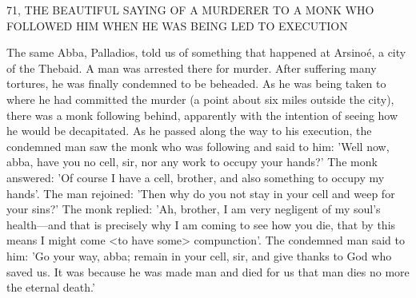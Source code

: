 71, THE BEAUTIFUL SAYING OF A MURDERER
TO A MONK WHO FOLLOWED HIM
WHEN HE WAS BEING LED TO EXECUTION

The same Abba, Palladios, told us of something that happened at
Arsinoé, a city of the Thebaid. A man was arrested there for
murder. After suffering many tortures, he was finally condemned to
be beheaded. As he was being taken to where he had committed the
murder (a point about six miles outside the city), there was a monk
following behind, apparently with the intention of seeing how he
would be decapitated. As he passed along the way to his execution,
the condemned man saw the monk who was following and said to
him: 'Well now, abba, have you no cell, sir, nor any work to occupy
your hands?' The monk answered: 'Of course I have a cell, brother,
and also something to occupy my hands'. The man rejoined: 'Then
why do you not stay in your cell and weep for your sins?' The
monk replied: 'Ah, brother, I am very negligent of my soul's
health—and that is precisely why I am coming to see how you die,
that by this means I might come <to have some> compunction'.
The condemned man said to him: 'Go your way, abba; remain in
your cell, sir, and give thanks to God who saved us. It was because
he was made man and died for us that man dies no more the eternal
death.'

